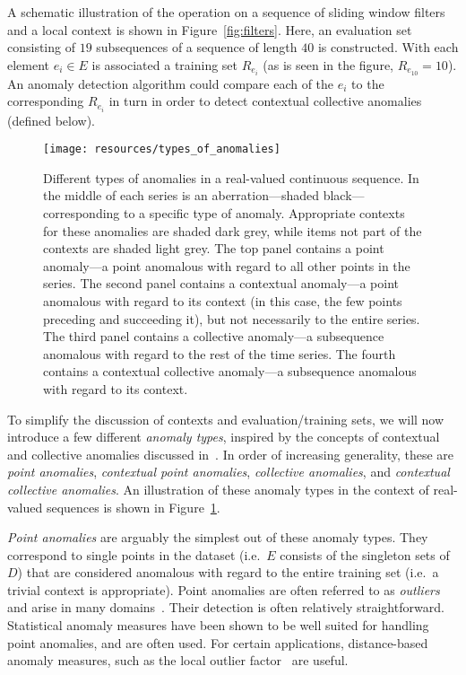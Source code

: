 A schematic illustration of the operation on a sequence of sliding window filters and a local context is shown in Figure~\ref{fig:filters}. Here, an evaluation set consisting of $19$ subsequences of a sequence of length $40$ is constructed. With each element $e_i \in E$ is associated a training set $R_{e_i}$ (as is seen in the figure, $R_{e_{10}} = 10$). An anomaly detection algorithm could compare each of the $e_i$ to the corresponding $R_{e_i}$ in turn in order to detect contextual collective anomalies (defined below).

\begin{figure}[htb]
    \begin{center}
        \texttt{[image: resources/types\_of\_anomalies]}
    \end{center}
    \caption{{\small Different types of anomalies in a real-valued continuous sequence. In the middle of each series is an aberration---shaded black---corresponding to a specific type of anomaly. Appropriate contexts for these anomalies are shaded dark grey, while items not part of the contexts are shaded light grey. The top panel contains a point anomaly---a point anomalous with regard to all other points in the series. The second panel contains a contextual anomaly---a point anomalous with regard to its context (in this case, the few points preceding and succeeding it), but not necessarily to the entire series. The third panel contains a collective anomaly---a subsequence anomalous with regard to the rest of the time series. The fourth contains a contextual collective anomaly---a subsequence anomalous with regard to its context.}}
\label{fig:anomaly_types}
\end{figure}

To simplify the discussion of contexts and evaluation/training sets, we will now introduce a few different \emph{anomaly types}, inspired by the concepts of contextual and collective anomalies discussed in~\cite{chandola}. In order of increasing generality, these are \emph{point anomalies}, \emph{contextual point anomalies}, \emph{collective anomalies}, and \emph{contextual collective anomalies}. An illustration of these anomaly types in the context of real-valued sequences is shown in Figure~\ref{fig:anomaly_types}.

\emph{Point anomalies} are arguably the simplest out of these anomaly types. They correspond to single points in the dataset (i.e.\ $E$ consists of the singleton sets of $D$) that are considered anomalous with regard to the entire training set (i.e.\ a trivial context is appropriate). Point anomalies are often referred to as \emph{outliers} and arise in many domains~\cite{eskin}. Their detection is often relatively straightforward. Statistical anomaly measures have been shown to be well suited for handling point anomalies, and are often used. For certain applications, distance-based anomaly measures, such as the local outlier factor~\cite{TODO} are useful.

